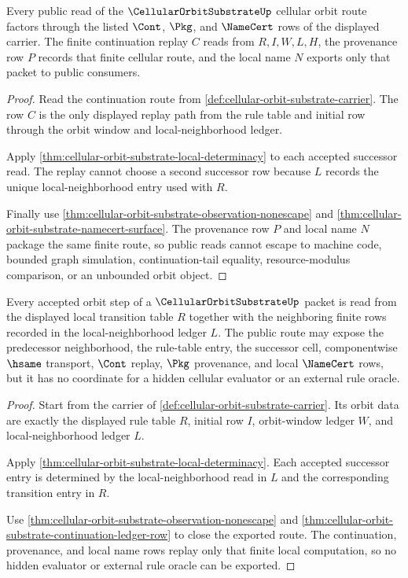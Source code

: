 \begin{theorem}
\label{thm:cellular-orbit-substrate-continuation-ledger-row}
Every public read of the $\CellularOrbitSubstrateUp$ cellular orbit route factors through the listed $\Cont$, $\Pkg$, and $\NameCert$ rows of the displayed carrier. The finite continuation replay $C$ reads from $R,I,W,L,H$, the provenance row $P$ records that finite cellular route, and the local name $N$ exports only that packet to public consumers.
\end{theorem}
\begin{proof}
Read the continuation route from \autoref{def:cellular-orbit-substrate-carrier}. The row $C$ is the only displayed replay path from the rule table and initial row through the orbit window and local-neighborhood ledger.

Apply \autoref{thm:cellular-orbit-substrate-local-determinacy} to each accepted successor read. The replay cannot choose a second successor row because $L$ records the unique local-neighborhood entry used with $R$.

Finally use \autoref{thm:cellular-orbit-substrate-observation-nonescape} and \autoref{thm:cellular-orbit-substrate-namecert-surface}. The provenance row $P$ and local name $N$ package the same finite route, so public reads cannot escape to machine code, bounded graph simulation, continuation-tail equality, resource-modulus comparison, or an unbounded orbit object.
\end{proof}

\begin{theorem}
\label{thm:cellular-orbit-substrate-rule-locality-obligation}
Every accepted orbit step of a $\CellularOrbitSubstrateUp$ packet is read from the displayed local transition table $R$ together with the neighboring finite rows recorded in the local-neighborhood ledger $L$. The public route may expose the predecessor neighborhood, the rule-table entry, the successor cell, componentwise $\hsame$ transport, $\Cont$ replay, $\Pkg$ provenance, and local $\NameCert$ rows, but it has no coordinate for a hidden cellular evaluator or an external rule oracle.
\end{theorem}
\begin{proof}
Start from the carrier of \autoref{def:cellular-orbit-substrate-carrier}. Its orbit data are exactly the displayed rule table $R$, initial row $I$, orbit-window ledger $W$, and local-neighborhood ledger $L$.

Apply \autoref{thm:cellular-orbit-substrate-local-determinacy}. Each accepted successor entry is determined by the local-neighborhood read in $L$ and the corresponding transition entry in $R$.

Use \autoref{thm:cellular-orbit-substrate-observation-nonescape} and \autoref{thm:cellular-orbit-substrate-continuation-ledger-row} to close the exported route. The continuation, provenance, and local name rows replay only that finite local computation, so no hidden evaluator or external rule oracle can be exported.
\end{proof}

